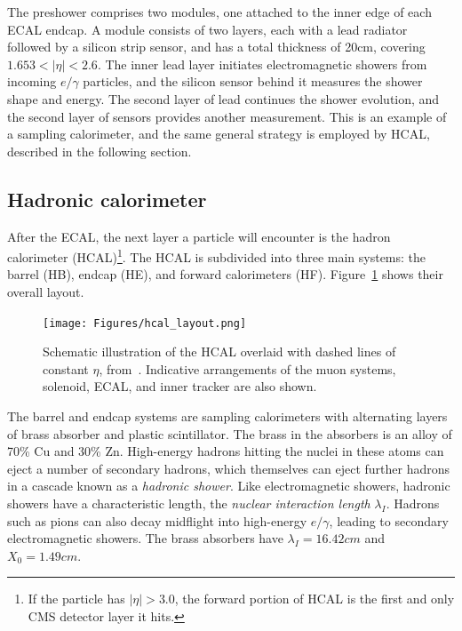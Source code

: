 The preshower comprises two modules, one attached to the inner edge of each ECAL endcap. A module consists of two layers,
each with a lead radiator followed by a silicon strip sensor, and has a total thickness of 20\unit{cm}, covering $1.653 < |\eta| < 2.6$.
The inner lead layer initiates electromagnetic showers from incoming $e/\gamma$ particles,
and the silicon sensor behind it measures the shower shape and energy.
The second layer of lead continues the shower evolution, and the second layer of sensors provides another measurement.
This is an example of a sampling calorimeter, and the same general strategy is employed by HCAL, described in the following section.

\subsection{Hadronic calorimeter} \label{sec:LHCCMS_CMS_HCAL}
After the ECAL, the next layer a particle will encounter is the hadron calorimeter (HCAL)\footnote{If the particle has $|\eta| > 3.0$,
the forward portion of HCAL is the first and only CMS detector layer it hits.}.
The HCAL is subdivided into three main systems: the barrel (HB), endcap (HE), and forward calorimeters (HF).
Figure~\ref{fig:hcal_schematic} shows their overall layout.

\begin{figure}[hbtp]
  \begin{center}
    \texttt{[image: Figures/hcal\_layout.png]}
    \caption{
    Schematic illustration of the HCAL overlaid with dashed lines of constant $\eta$, from~\cite{ref:1748-0221/3/08/S08004}.
    Indicative arrangements of the muon systems, solenoid, ECAL, and inner tracker are also shown.
    }
    \label{fig:hcal_schematic}
  \end{center}
\end{figure}

The barrel and endcap systems are sampling calorimeters with alternating layers of brass absorber and plastic scintillator.
The brass in the absorbers is an alloy of 70\% Cu and 30\% Zn. High-energy hadrons hitting the nuclei in these atoms can eject
a number of secondary hadrons, which themselves can eject further hadrons in a cascade known as a \textit{hadronic shower}.
Like electromagnetic showers, hadronic showers have a characteristic length, the \textit{nuclear interaction length} $\lambda_{I}$.
Hadrons such as pions can also decay midflight into high-energy $e/\gamma$, leading to secondary electromagnetic showers.
The brass absorbers have $\lambda_{I} = 16.42\unit{cm}$ and $X_{0} = 1.49\unit{cm}$.

